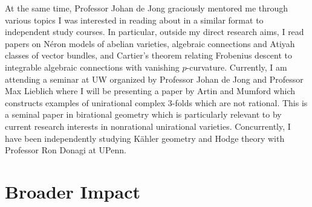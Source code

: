 \documentclass[11pt]{amsart}
\begin{document}
At the same time, Professor Johan de Jong graciously mentored me through various topics I was interested in reading about in a similar format to independent study courses. In particular, outside my direct research aims, I read papers on N\'{e}ron models of abelian varieties, algebraic connections and Atiyah classes of vector bundles, and Cartier's theorem relating Frobenius descent to integrable algebraic connections with vanishing $p$-curvature. Currently, I am attending a seminar at UW organized by Professor Johan de Jong and Professor Max Lieblich where I will be presenting a paper by Artin and Mumford which constructs examples of unirational complex $3$-folds which are not rational. This is a seminal paper in birational geometry which is particularly relevant to by current research interests in nonrational unirational varieties. Concurrently, I have been independently studying K\"{a}hler geometry and Hodge theory with Professor Ron Donagi at UPenn.

\section*{Broader Impact}
\end{document}
